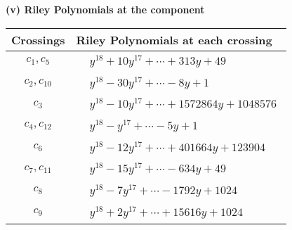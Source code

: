 \documentclass[1p]{elsarticle_modified}
\theoremstyle{definition}
\begin{document}
\newpage\renewcommand{\arraystretch}{1}
\flushleft \textbf{(v) Riley Polynomials at the component}\newline \\
\begin{tabular}{m{50pt}|m{274pt}}
Crossings & \hspace{64pt}Riley Polynomials at each crossing \\
\hline $$\begin{aligned}c_{1},c_{5}\end{aligned}$$&$\begin{aligned}
&y^{18}+10 y^{17}+\cdots+313 y+49
\end{aligned}$\\
\hline $$\begin{aligned}c_{2},c_{10}\end{aligned}$$&$\begin{aligned}
&y^{18}-30 y^{17}+\cdots-8 y+1
\end{aligned}$\\
\hline $$\begin{aligned}c_{3}\end{aligned}$$&$\begin{aligned}
&y^{18}-10 y^{17}+\cdots+1572864 y+1048576
\end{aligned}$\\
\hline $$\begin{aligned}c_{4},c_{12}\end{aligned}$$&$\begin{aligned}
&y^{18}- y^{17}+\cdots-5 y+1
\end{aligned}$\\
\hline $$\begin{aligned}c_{6}\end{aligned}$$&$\begin{aligned}
&y^{18}-12 y^{17}+\cdots+401664 y+123904
\end{aligned}$\\
\hline $$\begin{aligned}c_{7},c_{11}\end{aligned}$$&$\begin{aligned}
&y^{18}-15 y^{17}+\cdots-634 y+49
\end{aligned}$\\
\hline $$\begin{aligned}c_{8}\end{aligned}$$&$\begin{aligned}
&y^{18}-7 y^{17}+\cdots-1792 y+1024
\end{aligned}$\\
\hline $$\begin{aligned}c_{9}\end{aligned}$$&$\begin{aligned}
&y^{18}+2 y^{17}+\cdots+15616 y+1024
\end{aligned}$\\
\hline
\end{tabular}\\~\\
\end{document}
